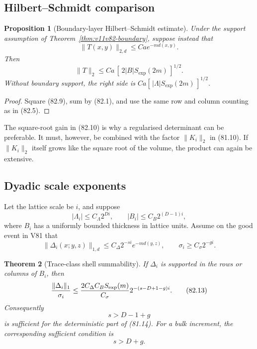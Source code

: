 \documentclass[11pt]{article}
\newtheorem{theorem}{Theorem}[section]
\newtheorem{proposition}[theorem]{Proposition}
\begin{document}
\subsection{Hilbert--Schmidt comparison}

\begin{proposition}[Boundary-layer Hilbert--Schmidt estimate]
\label{prop:v11v82-HS}
Under the support assumption of
Theorem~\ref{thm:v11v82-boundary}, suppose instead that
\[
                 \|T(x,y)\|_{2,d}
                 \le Ca e^{-m d(x,y)}.                      \tag{82.9}
\]
Then
\[
                  \|T\|_2
                  \le Ca\,[\,2|B|S_{\exp}(2m)\,]^{1/2}.      \tag{82.10}
\]
Without boundary support, the right side is
\(Ca[\,|\Lambda|S_{\exp}(2m)\,]^{1/2}\).
\end{proposition}

\begin{proof}
Square (82.9), sum by (82.1), and use the same row and column
counting as in (82.5).
\end{proof}

The square-root gain in (82.10) is why a regularised determinant can
be preferable.  It must, however, be combined with the factor
\(\|K_i\|_2\) in (81.10).  If \(\|K_i\|_2\) itself grows like the
square root of the volume, the product can again be extensive.

\subsection{Dyadic scale exponents}

Let the lattice scale be \(i\), and suppose
\[
 |\Lambda_i|\le C_\Lambda 2^{Di},\qquad
 |B_i|\le C_B2^{(D-1)i},                                    \tag{82.11}
\]
where \(B_i\) has a uniformly bounded thickness in lattice units.
Assume on the good event in V81 that
\[
 \|\Delta_i(x;y,z)\|_{1,d}
       \le C_\Delta 2^{-si}e^{-m d(y,z)},\qquad
 \sigma_i\ge C_\sigma2^{-gi}.                               \tag{82.12}
\]

\begin{theorem}[Trace-class shell summability]
\label{thm:v11v82-exponents}
If \(\Delta_i\) is supported in the rows or columns of \(B_i\), then
\[
 {\|\Delta_i\|_1\over\sigma_i}
 \le {2C_\Delta C_BS_{\exp}(m)\over C_\sigma}
        2^{-(s-D+1-g)i}.                                    \tag{82.13}
\]
Consequently
\[
                                  s>D-1+g                    \tag{82.14}
\]
is sufficient for the deterministic part of (81.14).  For a bulk
increment, the corresponding sufficient condition is
\[
                                  s>D+g.                     \tag{82.15}
\]
\end{theorem}
\end{document}
